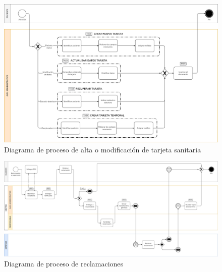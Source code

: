 \documentclass[12pt, a4paper, twoside, openright]{report}
\begin{document}
\begin{figure}
    \centering
    \begin{sideways}
        \includegraphics[width=0.95\textheight]{img/proceso-tarjeta.png}
    \end{sideways}
    \caption{Diagrama de proceso de alta o modificación de tarjeta sanitaria}
    \label{fig:proceso-tarjeta}
\end{figure}

\begin{figure}
    \centering
    \begin{sideways}
        \includegraphics[width=0.95\textheight]{img/proceso-reclamaciones.png}
    \end{sideways}
    \caption{Diagrama de proceso de reclamaciones}
    \label{fig:proceso-reclamaciones}
\end{figure}
\end{document}
